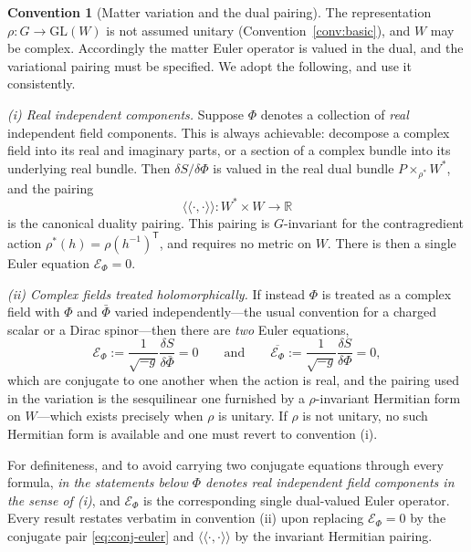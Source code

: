 \documentclass[11pt,a4paper]{article}
\theoremstyle{plain}
\theoremstyle{definition}
\newtheorem{convention}[theorem]{Convention}
\theoremstyle{remark}
\newcommand{\Real}{\mathbb{R}}
\begin{document}
\begin{convention}[Matter variation and the dual pairing]
\label{conv:matter}
The representation $\rho\colon G\to\mathrm{GL}(W)$ is not assumed unitary
(Convention~\ref{conv:basic}), and $W$ may be complex. Accordingly the matter Euler operator is
valued in the dual, and the variational pairing must be specified. We adopt the following, and use
it consistently.

\emph{(i) Real independent components.} Suppose $\Phi$ denotes a collection of \emph{real}
independent field components. This is always achievable: decompose a complex field into its real
and imaginary parts, or a section of a complex bundle into its underlying real bundle. Then
$\delta S/\delta\Phi$ is valued in the real dual bundle $P\times_{\rho^{*}}W^{*}$, and the
pairing
\[
\langle\!\langle\cdot,\cdot\rangle\!\rangle\colon W^{*}\times W\longrightarrow\Real
\]
is the canonical duality pairing. This pairing is $G$-invariant for the contragredient action
$\rho^{*}(h)=\rho(h^{-1})^{\mathsf{T}}$, and requires no metric on $W$. There is then a single
Euler equation $\mathcal{E}_\Phi=0$.

\emph{(ii) Complex fields treated holomorphically.} If instead $\Phi$ is treated as a complex field
with $\Phi$ and $\bar\Phi$ varied independently---the usual convention for a charged scalar or a
Dirac spinor---then there are \emph{two} Euler equations,
\begin{equation}
\label{eq:conj-euler}
\mathcal{E}_{\Phi}:=\frac{1}{\sqrt{-g}}\frac{\delta S}{\delta \bar\Phi}=0
\qquad\text{and}\qquad
\overline{\mathcal{E}_{\Phi}}:=\frac{1}{\sqrt{-g}}\frac{\delta S}{\delta \Phi}=0 ,
\end{equation}
which are conjugate to one another when the action is real, and the pairing used in the variation is
the sesquilinear one furnished by a $\rho$-invariant Hermitian form on $W$---which exists precisely
when $\rho$ is unitary. If $\rho$ is not unitary, no such Hermitian form is available and one must
revert to convention (i).

For definiteness, and to avoid carrying two conjugate equations through every formula, \emph{in the
statements below $\Phi$ denotes real independent field components in the sense of (i)}, and
$\mathcal{E}_\Phi$ is the corresponding single dual-valued Euler operator. Every result restates
verbatim in convention (ii) upon replacing $\mathcal{E}_{\Phi}=0$ by the conjugate pair
\eqref{eq:conj-euler} and $\langle\!\langle\cdot,\cdot\rangle\!\rangle$ by the invariant Hermitian
pairing.
\end{convention}
\end{document}
